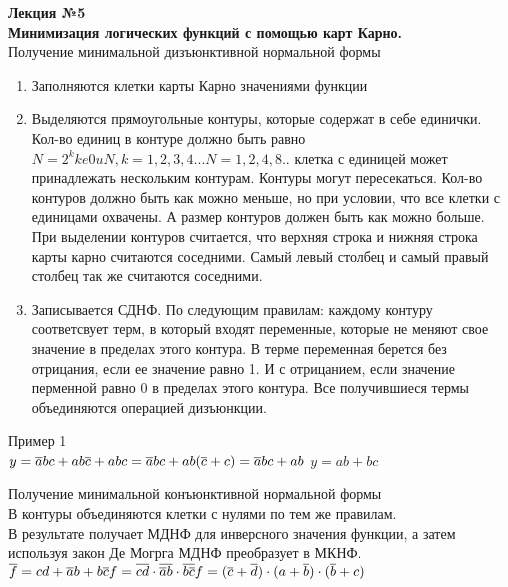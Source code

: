 

\LARGE{ \textbf {Лекция №5}}\\

\Large{ \textbf { Минимизация логических функций с помощью карт Карно. }}\\
Получение минимальной дизъюнктивной нормальной формы
\begin{enumerate}
  \item Заполняются клетки карты Карно значениями функции
  \item Выделяются прямоугольные контуры, которые содержат в себе единички.
  Кол-во единиц в контуре должно быть равно $ N = 2^k k e 0 uN, k = 1,2,3,4... N = 1,2,4,8..$ клетка с единицей может принадлежать нескольким контурам. Контуры могут пересекаться. Кол-во контуров должно быть как можно меньше, но при условии, что все клетки с единицами охвачены. А размер контуров должен быть как можно больше. При выделении контуров считается, что верхняя строка и нижняя строка карты карно считаются соседними.
  Самый левый столбец и самый правый столбец так же считаются соседними.
  \item Записывается СДНФ. По следующим правилам: каждому контуру соответсвует терм, в который входят переменные, которые не меняют свое значение в пределах этого контура. В терме переменная берется без отрицания, если ее значение равно 1.
  И с отрицанием, если значение перменной равно 0  в пределах этого контура. Все получившиеся термы объединяются операцией дизъюнкции.
\end{enumerate}

Пример 1\\
$ y = \overline{a}bc + ab\overline{c} + abc \\
= \overline{a}bc + ab(\overline{c}+c)\\
= \overline{a}bc + ab\\
$
$
y = ab + bc
$


Получение минимальной конъюнктивной нормальной формы\\
В контуры объединяются клетки с нулями по тем же правилам.\\
В результате получает МДНФ для инверсного значения функции, а затем используя закон Де Могрга МДНФ преобразует в МКНФ.\\
$
\overline{f} = cd + \overline{a}b + b\overline{c} \\
f = \overline{cd} \cdot \overline{ \overline{a} b } \cdot \overline{b \overline{c}} \\
f = (\overline{c} + \overline{d}) \cdot (a + \overline{b}) \cdot (\overline{b} + c)
$

